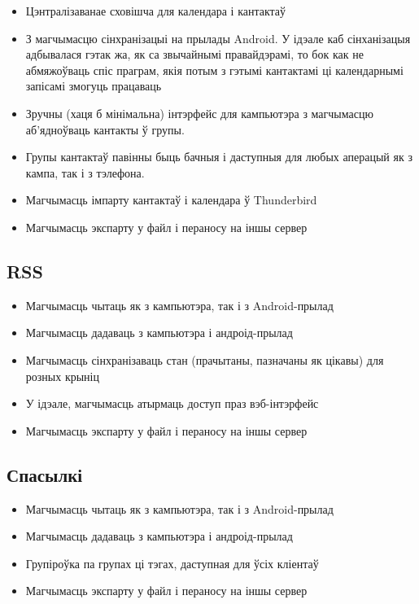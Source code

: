\documentclass[10pt, a5paper]{article}
\begin{document}
\begin{itemize}
  \item Цэнтралізаванае сховішча для календара і кантактаў
  \item З магчымасцю сінхранізацыі на прылады Android. У ідэале каб сінханізацыя адбывалася гэтак жа, як са звычайнымі правайдэрамі, то бок как не абмяжоўваць спіс праграм, якія потым з гэтымі кантактамі ці календарнымі запісамі змогуць працаваць
  \item Зручны (хаця б мінімальна) інтэрфейс для кампьютэра з магчымасцю аб'ядноўваць кантакты ў групы.
  \item Групы кантактаў павінны быць бачныя і даступныя для любых аперацый як з кампа, так і з тэлефона.
  \item Магчымасць імпарту кантактаў і календара ў Thunderbird
  \item Магчымасць экспарту у файл і пераносу на іншы сервер
\end{itemize}

\subsection*{RSS}

\begin{itemize}
  \item Магчымасць чытаць як з кампьютэра, так і з Android-прылад
  \item Магчымасць дадаваць з кампьютэра і андроід-прылад
  \item Магчымасць сінхранізаваць стан (прачытаны, пазначаны як цікавы) для розных крыніц
  \item У ідэале, магчымасць атырмаць доступ праз вэб-інтэрфейс
  \item Магчымасць экспарту у файл і пераносу на іншы сервер
\end{itemize}

\subsection*{Спасылкі}

\begin{itemize}
  \item Магчымасць чытаць як з кампьютэра, так і з Android-прылад
  \item Магчымасць дадаваць з кампьютэра і андроід-прылад
  \item Групіроўка па групах ці тэгах, даступная для ўсіх кліентаў
  \item Магчымасць экспарту у файл і пераносу на іншы сервер
\end{itemize}
\end{document}
